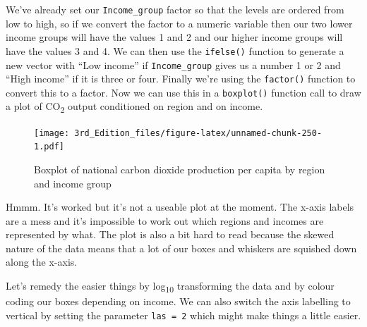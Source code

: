 \documentclass[
]{book}
\newenvironment{Shaded}{\begin{snugshade}}{\end{snugshade}}
\newcommand{\DataTypeTok}[1]{\textcolor[rgb]{0.13,0.29,0.53}{#1}}
\newcommand{\DecValTok}[1]{\textcolor[rgb]{0.00,0.00,0.81}{#1}}
\newcommand{\KeywordTok}[1]{\textcolor[rgb]{0.13,0.29,0.53}{\textbf{#1}}}
\newcommand{\NormalTok}[1]{#1}
\newcommand{\OperatorTok}[1]{\textcolor[rgb]{0.81,0.36,0.00}{\textbf{#1}}}
\newcommand{\StringTok}[1]{\textcolor[rgb]{0.31,0.60,0.02}{#1}}
\begin{document}
We've already set our \texttt{Income\_group} factor so that the levels are ordered from low to high, so if we convert the factor to a numeric variable then our two lower income groups will have the values 1 and 2 and our higher income groups will have the values 3 and 4. We can then use the \texttt{ifelse()} function to generate a new vector with ``Low income'' if \texttt{Income\_group} gives us a number 1 or 2 and ``High income'' if it is three or four. Finally we're using the \texttt{factor()} function to convert this to a factor. Now we can use this in a \texttt{boxplot()} function call to draw a plot of CO\textsubscript{2} output conditioned on region and on income.

\begin{Shaded}
\end{Shaded}

\begin{figure}
\centering
\texttt{[image: 3rd\_Edition\_files/figure-latex/unnamed-chunk-250-1.pdf]}
\caption{\label{fig:unnamed-chunk-250}Boxplot of national carbon dioxide production per capita by region and income group}
\end{figure}

Hmmm. It's worked but it's not a useable plot at the moment. The x-axis labels are a mess and it's impossible to work out which regions and incomes are represented by what. The plot is also a bit hard to read because the skewed nature of the data means that a lot of our boxes and whiskers are squished down along the x-axis.

Let's remedy the easier things by log\textsubscript{10} transforming the data and by colour coding our boxes depending on income. We can also switch the axis labelling to vertical by setting the parameter \texttt{las\ =\ 2} which might make things a little easier.

\begin{Shaded}
\end{Shaded}
\end{document}
